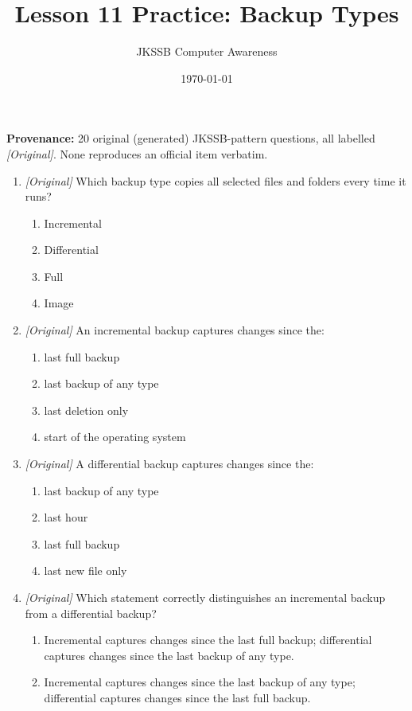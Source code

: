 \documentclass[11pt]{article}
\title{Lesson 11 Practice: Backup Types}
\author{JKSSB Computer Awareness}
\date{\today}
\begin{document}
\maketitle
\noindent\textbf{Provenance:} 20 original (generated) JKSSB-pattern
questions, all labelled \textit{[Original]}. None reproduces an official item
verbatim.

\begin{enumerate}[label=\textbf{Q\arabic*.}, leftmargin=*]
\item \textit{[Original]} Which backup type copies all selected files and
  folders every time it runs?
  \begin{enumerate}[label=\Alph*.]
    \item Incremental
    \item Differential
    \item Full
    \item Image
  \end{enumerate}
\item \textit{[Original]} An incremental backup captures changes since the:
  \begin{enumerate}[label=\Alph*.]
    \item last full backup
    \item last backup of any type
    \item last deletion only
    \item start of the operating system
  \end{enumerate}
\item \textit{[Original]} A differential backup captures changes since the:
  \begin{enumerate}[label=\Alph*.]
    \item last backup of any type
    \item last hour
    \item last full backup
    \item last new file only
  \end{enumerate}
\item \textit{[Original]} Which statement correctly distinguishes an
  incremental backup from a differential backup?
  \begin{enumerate}[label=\Alph*.]
    \item Incremental captures changes since the last full backup;
      differential captures changes since the last backup of any type.
    \item Incremental captures changes since the last backup of any type;
      differential captures changes since the last full backup.

\end{enumerate}
\end{enumerate}
\end{document}
